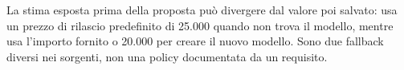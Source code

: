 La stima esposta prima della proposta può divergere dal valore poi salvato:  usa un prezzo di rilascio predefinito di 25.000 quando non trova il modello, mentre  usa l'importo fornito o 20.000 per creare il nuovo modello. Sono due fallback diversi nei sorgenti, non una policy documentata da un requisito.
